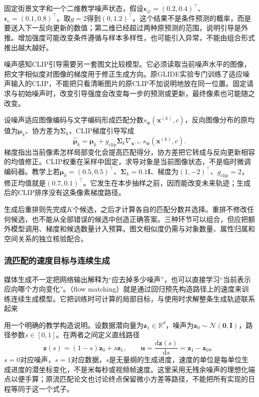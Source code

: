 固定街景文字和一个二维教学噪声状态，假设$\bm\epsilon_{\varnothing}=(0.2,0.4)^\top$、$\bm\epsilon_{\mathrm c}=(0.1,0.8)^\top$。取$g=2$得到$(0,1.2)^\top$。这个结果不是条件预测的概率，而是要送入下一反向更新的数值；第二维已经超过两种原预测的范围，说明引导是外推。增加强度可能改变条件遵循与样本多样性，也可能引入异常，不能由组合形式推出越大越好。

噪声感知CLIP引导需要另一套图文比较模型。它必须读取当前噪声水平的图像，把文字相似度对图像的梯度用于修正生成方向。原GLIDE实验专门训练了适应噪声输入的CLIP，不能把只看清晰图片的原CLIP不加说明地放在同一位置。固定请求与初始噪声时，改变引导强度会改变每一步的预测或更新，最终像素也可能随之改变。

设噪声适应图像编码与文字编码形成匹配分数$s_{\bm\phi}(\bm x^{(k)},c)$，反向图像分布的原均值为$\bm\mu_k$、协方差为$\bm\Sigma_k$，CLIP梯度引导写成
\begin{equation}
  \widehat{\bm\mu}_k
   =\bm\mu_k+g_{\mathrm{clip}}\bm\Sigma_k
           \nabla_{\bm x^{(k)}}s_{\bm\phi}(\bm x^{(k)},c).
  \label{eq:vision-glide-clip-interface}
\end{equation}
梯度指出当前像素怎样局部变化会提高匹配得分，协方差把它转成与反向更新相容的均值修正。CLIP权重在采样中固定，求导对象是当前图像状态，不是临时微调编码器。教学上若$\bm\mu_k=(0.5,0.5)^\top$、$\bm\Sigma_k=0.1\bm I$、梯度为$(1,-2)^\top$、$g_{\mathrm{clip}}=2$，修正均值就是$(0.7,0.1)^\top$。它发生在本步抽样之前，因而能改变未来轨迹；生成后的CLIP排序没有这条像素梯度路径。

生成后重排则先完成$K$个候选，之后才计算各自的匹配分数并选择。重排不修改任何候选，也不能从全部错误的候选中创造正确答案。三种环节可以组合，但应把额外模型调用、梯度和候选数量计入预算。图文相似度仍需与对象数量、属性归属和空间关系的独立核验配合。

\subsubsection{流匹配的速度目标与连续生成}
\label{sec:vision-models-flow-matching}

媒体生成不一定把网络输出解释为“应去掉多少噪声”，也可以直接学习“当前表示应向哪个方向变化”。（flow matching）就是通过回归预先构造路径上的速度来训练连续生成模型。它把训练时可计算的局部目标，与使用时求解整条生成轨迹联系起来

用一个明确的教学构造说明。设数据潜向量为$\bm z_1\in\mathbb R^d$，噪声为$\bm z_0\sim\mathcal N(\bm0,\bm I)$，路径参数$s\in[0,1]$。在两者之间定义直线路径
\begin{equation}
  \bm z(s)=(1-s)\bm z_0+s\bm z_1,
  \qquad
  \bm u=\frac{\mathrm d\bm z(s)}{\mathrm ds}
       =\bm z_1-\bm z_0\text{。}
  \label{eq:vision-flow-path}
\end{equation}
$s=0$对应噪声，$s=1$对应数据，$s$是无量纲的生成进度，速度的单位是每单位生成进度的潜坐标变化，不是米每秒或视频帧速度。这里采用无残余噪声的理想化端点以便手算；原流匹配论文也讨论终点保留微小方差等路径，不能把所有实现的日程等同于这一个式子。

